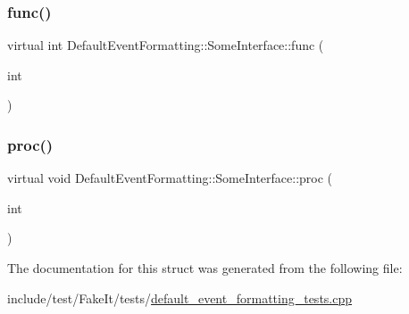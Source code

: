 \mbox{\label{structDefaultEventFormatting_1_1SomeInterface_a5ce21d5ec7b6de8a42f6d083f1121a2c}} 
\subsubsection{\texorpdfstring{func()}{func()}}
{\footnotesize\ttfamily virtual int Default\+Event\+Formatting\+::\+Some\+Interface\+::func (\begin{DoxyParamCaption}\item[{int}]{ }\end{DoxyParamCaption})\hspace{0.3cm}{\ttfamily [pure virtual]}}

\mbox{\label{structDefaultEventFormatting_1_1SomeInterface_adcb4cefc5e23428442115827ebd39323}} 
\subsubsection{\texorpdfstring{proc()}{proc()}}
{\footnotesize\ttfamily virtual void Default\+Event\+Formatting\+::\+Some\+Interface\+::proc (\begin{DoxyParamCaption}\item[{int}]{ }\end{DoxyParamCaption})\hspace{0.3cm}{\ttfamily [pure virtual]}}



The documentation for this struct was generated from the following file\+:\begin{DoxyCompactItemize}
\item 
include/test/\+Fake\+It/tests/\mbox{\hyperlink{default__event__formatting__tests_8cpp}{default\+\_\+event\+\_\+formatting\+\_\+tests.\+cpp}}\end{DoxyCompactItemize}
